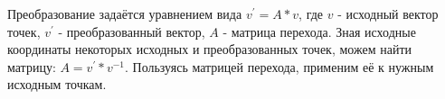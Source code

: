 \solutionSection

Преобразование задаётся уравнением вида $v^{'} = A * v$, где $v$ - исходный вектор точек, $v^{'}$ - преобразованный вектор, $A$ - матрица перехода.
Зная исходные координаты некоторых исходных и преобразованных точек, можем найти матрицу: $A = v^{'} * v^{-1}$. 
Пользуясь матрицей перехода, применим её к нужным исходным точкам.

\codeExample


